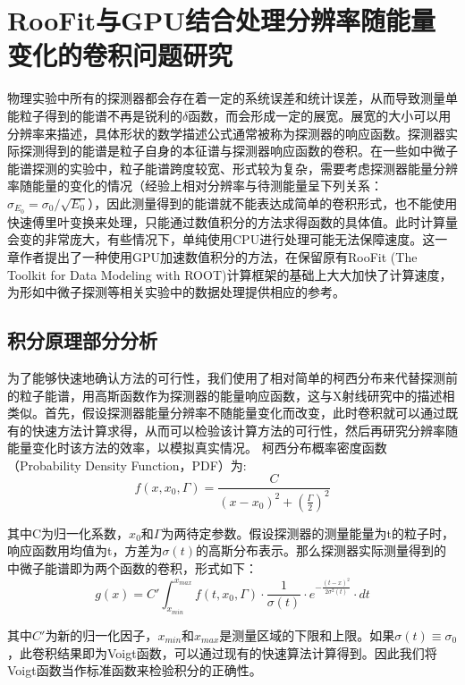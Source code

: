 \chapter{RooFit与GPU结合处理分辨率随能量变化的卷积问题研究}

物理实验中所有的探测器都会存在着一定的系统误差和统计误差，从而导致测量单能粒子得到的能谱不再是锐利的$\delta$函数，而会形成一定的展宽。展宽的大小可以用分辨率来描述，具体形状的数学描述公式通常被称为探测器的响应函数。探测器实际探测得到的能谱是粒子自身的本征谱与探测器响应函数的卷积。在一些如中微子能谱探测的实验中，粒子能谱跨度较宽、形式较为复杂\supercite{qian2015neutrino}，需要考虑探测器能量分辨率随能量的变化的情况（经验上相对分辨率与待测能量呈下列关系：$\sigma_{E_0}=\sigma_0/\sqrt{E_0}$）\supercite{leo2012techniques}，因此测量得到的能谱就不能表达成简单的卷积形式，也不能使用快速傅里叶变换来处理\supercite{mathworld}，只能通过数值积分的方法求得函数的具体值。此时计算量会变的非常庞大，有些情况下，单纯使用CPU进行处理可能无法保障速度。这一章作者提出了一种使用GPU加速数值积分的方法，在保留原有RooFit (The Toolkit for Data Modeling with ROOT)\supercite{roofit}计算框架的基础上大大加快了计算速度，为形如中微子探测等相关实验中的数据处理提供相应的参考。

\section{积分原理部分分析}

为了能够快速地确认方法的可行性，我们使用了相对简单的柯西分布来代替探测前的粒子能谱，用高斯函数作为探测器的能量响应函数，这与X射线研究中的描述相类似\supercite{wang2006cmga}。首先，假设探测器能量分辨率不随能量变化而改变，此时卷积就可以通过既有的快速方法计算求得，从而可以检验该计算方法的可行性，然后再研究分辨率随能量变化时该方法的效率，以模拟真实情况。
柯西分布概率密度函数（Probability Density Function，PDF）为:
\begin{equation}
    f(x,x_0,\Gamma)=\frac{C}{(x-x_0)^2+(\frac{\Gamma}{2})^2}
\end{equation}

其中C为归一化系数，$x_0$和$\Gamma$为两待定参数。假设探测器的测量能量为t的粒子时，响应函数用均值为t，方差为$\sigma(t)$的高斯分布表示。那么探测器实际测量得到的中微子能谱即为两个函数的卷积，形式如下：
\begin{equation}
    g(x)=C'\int_{x_{min}}^{x_{max}}f(t,x_0,\Gamma)\cdot\frac{1}{\sigma(t)}\cdot e^{-\frac{(t-x)^2}{2\sigma^2(t)}}\cdot dt 
\end{equation}

其中$C'$为新的归一化因子，$x_{min}$和$x_{max}$是测量区域的下限和上限。如果$\sigma(t)\equiv\sigma_0$，此卷积结果即为Voigt函数，可以通过现有的快速算法计算得到\supercite{abrarov2011efficient}。因此我们将Voigt函数当作标准函数来检验积分的正确性。

